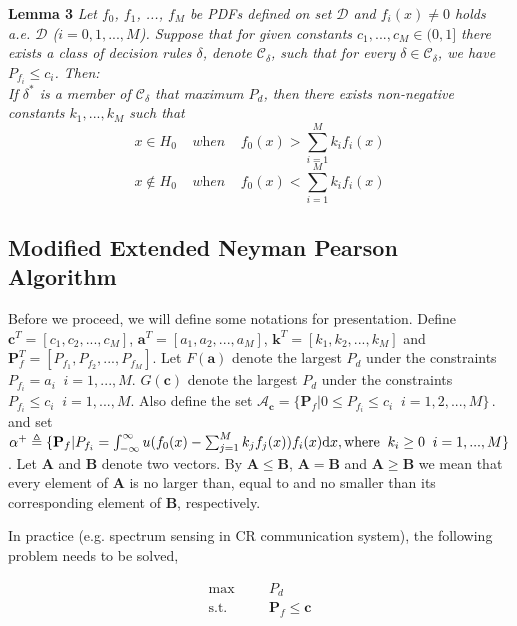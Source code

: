 \documentclass[12pt,journal,a4paper,twoside,onecolumn]{IEEEtran}
\newcommand{\rmnum}[1]{\romannumeral #1}
\begin{document}
\begin{spacing}{2.5}
\noindent \textbf{Lemma 3}
\noindent \textit{
    Let $f_0$, $f_1$, ..., $f_M$ be PDFs defined on set $\mathcal{D}$ and $f_i(x) \neq 0$ holds a.e. $\mathcal{D}$ ($i=0, 1,..., M$). Suppose that for given constants $c_1, ..., c_M \in (0, 1]$ there exists a class of decision rules $\delta$, denote $\mathcal{C}_\delta$, such that for every $\delta \in \mathcal{C}_\delta$, we have $P_{f_i} \leq c_i$.  Then:
\\ If  $\delta^{\ast}$ is a member of $\mathcal{C}_\delta$ that maximum $P_d$, then there exists non-negative constants $k_1, ..., k_M$ such that 
\[
x \in H_0 \;\;\;\;\textit{when}\;\;\;\;f_0(x) > \sum_{i=1}^{M}k_if_i(x)
\]
\[
x \notin H_0 \;\;\;\;\textit{when}\;\;\;\;f_0(x) < \sum_{i=1}^{M}k_if_i(x)
\]
}

\subsection{Modified Extended Neyman Pearson Algorithm}
\def \JUDGEMENT{u(f_0(x) - \sum_{j=1}^{M}k_j f_j(x))}
Before we proceed, we will define some notations for presentation.
Define $\mathbf{c}^T = [c_1, c_2, ..., c_M]$, $\mathbf{a}^T=[a_1, a_2, ..., a_M]$, $\mathbf{k}^T = [k_1, k_2, ..., k_M]$ and  $\mathbf{P}_f^T = [P_{f_1}, P_{f_2}, ..., P_{f_M}]$. Let
$F(\mathbf{a})$ denote the largest $P_d$ under the constraints $P_{f_i} = a_i\;\;i = 1, ..., M$.
$G(\mathbf{c})$ denote the largest $P_d$ under the constraints $P_{f_i} \leq c_i\;\;i = 1, ..., M$.
Also define the set $\mathcal{A}_\mathbf{c} = \{
  \mathbf{P}_f | 0 \leq P_{f_i} \leq c_i
  \;\;i=1, 2, ..., M\}\,.
$ and set $\alpha^+ \triangleq \{\mathbf{P}_f | P_{f_i} = \int_{-\infty}^{\infty} \JUDGEMENT f_i(x) \mathrm{d}x, \text{where\;\;} k_i \geq 0 \;\;i=1, ..., M\}$.
Let $\mathbf{A}$ and $\mathbf{B}$ denote two vectors. 
By $\mathbf{A} \leq \mathbf{B}$, $\mathbf{A} = \mathbf{B}$ and  $\mathbf{A} \geq \mathbf{B}$ we mean that every element of $\mathbf{A}$ is no larger than, equal to and no smaller than its corresponding element of $\mathbf{B}$, respectively. 

In practice (e.g. spectrum sensing in CR communication system), the following problem needs to be solved,

      \begin{equation}
      \label{equ: problemstate}
      \begin{split}
      \max\;\;\;\;\;\;&P_d\\
      \text{s.t.}\;\;\;\;\;\;&\mathbf{P}_f \leq \mathbf{c}
      \end{split}
      \end{equation}


\end{spacing}
\end{document}

